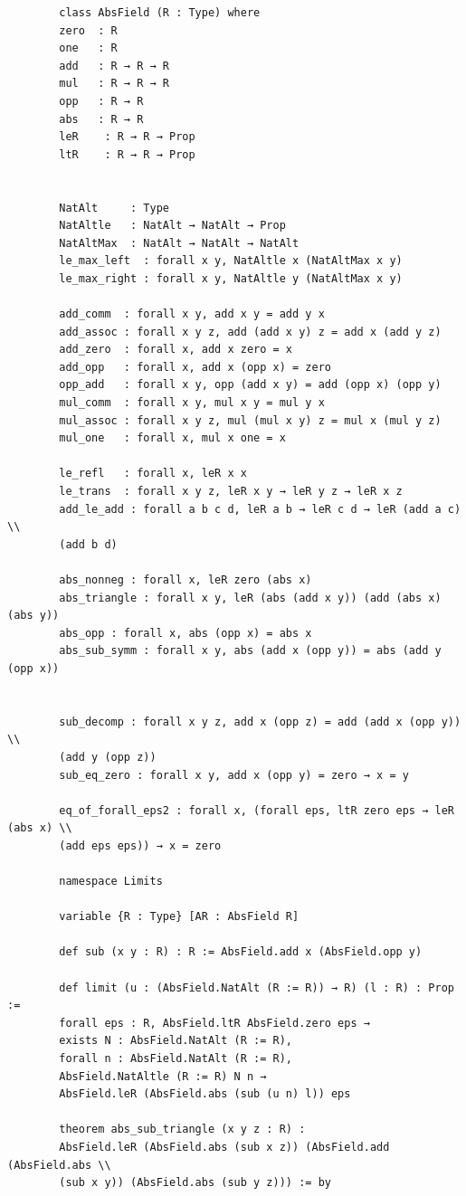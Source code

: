 \documentclass{article}
\theoremstyle{plain}
\theoremstyle{definition}
\theoremstyle{remark}
\begin{document}
	\begin{verbatim}
		class AbsField (R : Type) where
		zero  : R
		one   : R
		add   : R → R → R
		mul   : R → R → R
		opp   : R → R
		abs   : R → R
		leR    : R → R → Prop
		ltR    : R → R → Prop
		
		
		NatAlt     : Type
		NatAltle   : NatAlt → NatAlt → Prop
		NatAltMax  : NatAlt → NatAlt → NatAlt
		le_max_left  : forall x y, NatAltle x (NatAltMax x y)
		le_max_right : forall x y, NatAltle y (NatAltMax x y)
		
		add_comm  : forall x y, add x y = add y x
		add_assoc : forall x y z, add (add x y) z = add x (add y z)
		add_zero  : forall x, add x zero = x
		add_opp   : forall x, add x (opp x) = zero
		opp_add   : forall x y, opp (add x y) = add (opp x) (opp y)
		mul_comm  : forall x y, mul x y = mul y x
		mul_assoc : forall x y z, mul (mul x y) z = mul x (mul y z)
		mul_one   : forall x, mul x one = x
		
		le_refl   : forall x, leR x x
		le_trans  : forall x y z, leR x y → leR y z → leR x z
		add_le_add : forall a b c d, leR a b → leR c d → leR (add a c) \\
		(add b d)
		
		abs_nonneg : forall x, leR zero (abs x)
		abs_triangle : forall x y, leR (abs (add x y)) (add (abs x) (abs y))
		abs_opp : forall x, abs (opp x) = abs x
		abs_sub_symm : forall x y, abs (add x (opp y)) = abs (add y (opp x))
		
		
		sub_decomp : forall x y z, add x (opp z) = add (add x (opp y)) \\
		(add y (opp z))
		sub_eq_zero : forall x y, add x (opp y) = zero → x = y
		
		eq_of_forall_eps2 : forall x, (forall eps, ltR zero eps → leR (abs x) \\
		(add eps eps)) → x = zero
		
		namespace Limits
		
		variable {R : Type} [AR : AbsField R]
		
		def sub (x y : R) : R := AbsField.add x (AbsField.opp y)
		
		def limit (u : (AbsField.NatAlt (R := R)) → R) (l : R) : Prop :=
		forall eps : R, AbsField.ltR AbsField.zero eps →
		exists N : AbsField.NatAlt (R := R),
		forall n : AbsField.NatAlt (R := R),
		AbsField.NatAltle (R := R) N n →
		AbsField.leR (AbsField.abs (sub (u n) l)) eps
		
		theorem abs_sub_triangle (x y z : R) :
		AbsField.leR (AbsField.abs (sub x z)) (AbsField.add (AbsField.abs \\
		(sub x y)) (AbsField.abs (sub y z))) := by
		

\end{verbatim}
\end{document}
